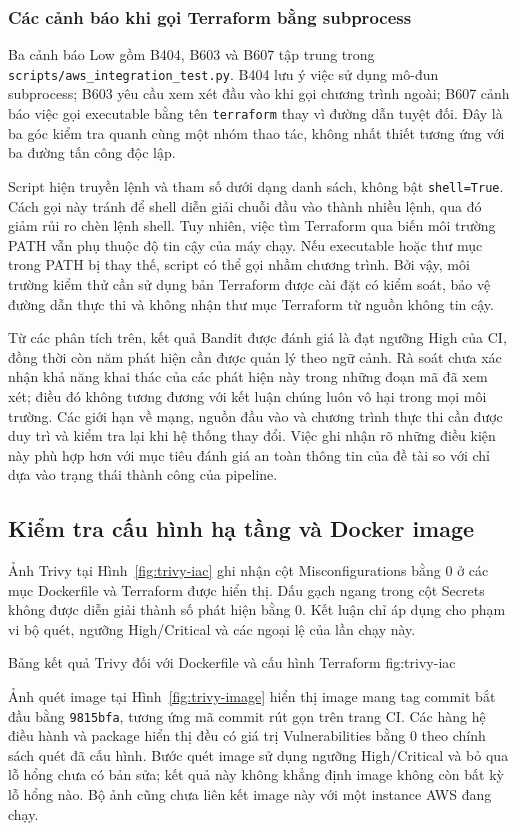 \subsubsection{Các cảnh báo khi gọi Terraform bằng subprocess}
Ba cảnh báo Low gồm B404, B603 và B607 tập trung trong \nolinkurl{scripts/aws_integration_test.py}. B404 lưu ý việc sử dụng mô-đun subprocess; B603 yêu cầu xem xét đầu vào khi gọi chương trình ngoài; B607 cảnh báo việc gọi executable bằng tên \texttt{terraform} thay vì đường dẫn tuyệt đối. Đây là ba góc kiểm tra quanh cùng một nhóm thao tác, không nhất thiết tương ứng với ba đường tấn công độc lập.

Script hiện truyền lệnh và tham số dưới dạng danh sách, không bật \texttt{shell=True}. Cách gọi này tránh để shell diễn giải chuỗi đầu vào thành nhiều lệnh, qua đó giảm rủi ro chèn lệnh shell. Tuy nhiên, việc tìm Terraform qua biến môi trường PATH vẫn phụ thuộc độ tin cậy của máy chạy. Nếu executable hoặc thư mục trong PATH bị thay thế, script có thể gọi nhầm chương trình. Bởi vậy, môi trường kiểm thử cần sử dụng bản Terraform được cài đặt có kiểm soát, bảo vệ đường dẫn thực thi và không nhận thư mục Terraform từ nguồn không tin cậy.

Từ các phân tích trên, kết quả Bandit được đánh giá là đạt ngưỡng High của CI, đồng thời còn năm phát hiện cần được quản lý theo ngữ cảnh. Rà soát chưa xác nhận khả năng khai thác của các phát hiện này trong những đoạn mã đã xem xét; điều đó không tương đương với kết luận chúng luôn vô hại trong mọi môi trường. Các giới hạn về mạng, nguồn đầu vào và chương trình thực thi cần được duy trì và kiểm tra lại khi hệ thống thay đổi. Việc ghi nhận rõ những điều kiện này phù hợp hơn với mục tiêu đánh giá an toàn thông tin của đề tài so với chỉ dựa vào trạng thái thành công của pipeline.

\subsection{Kiểm tra cấu hình hạ tầng và Docker image}
Ảnh Trivy tại Hình~\ref{fig:trivy-iac} ghi nhận cột Misconfigurations bằng 0 ở các mục Dockerfile và Terraform được hiển thị. Dấu gạch ngang trong cột Secrets không được diễn giải thành số phát hiện bằng 0. Kết luận chỉ áp dụng cho phạm vi bộ quét, ngưỡng High/Critical và các ngoại lệ của lần chạy này.

{Bảng kết quả Trivy đối với Dockerfile và cấu hình Terraform}
{fig:trivy-iac}

Ảnh quét image tại Hình~\ref{fig:trivy-image} hiển thị image mang tag commit bắt đầu bằng \texttt{9815bfa}, tương ứng mã commit rút gọn trên trang CI. Các hàng hệ điều hành và package hiển thị đều có giá trị Vulnerabilities bằng 0 theo chính sách quét đã cấu hình. Bước quét image sử dụng ngưỡng High/Critical và bỏ qua lỗ hổng chưa có bản sửa; kết quả này không khẳng định image không còn bất kỳ lỗ hổng nào. Bộ ảnh cũng chưa liên kết image này với một instance AWS đang chạy.

